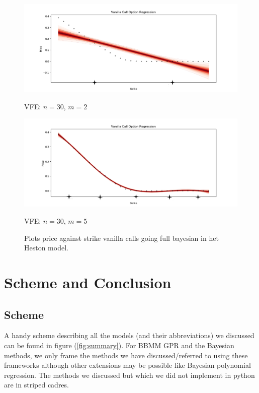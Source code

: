 \documentclass[12pt,a4paper,oneside]{book}
\begin{document}
\begin{figure}[!htb]
   \begin{minipage}{0.47\textwidth}
     \centering
     \includegraphics[width=1.1\linewidth]{full_bayesian_5}
     \caption*{VFE: $n=30$, $m=2$}\label{fig:bayesian_5}
   \end{minipage}\hfill
   \begin{minipage}{0.47\textwidth}
     \centering
     \includegraphics[width=1.1\linewidth]{full_bayesian_6}
     \caption*{VFE: $n=30$, $m=5$}\label{fig:bayesian_6}
   \end{minipage}\hfill
        \caption{Plots price against strike vanilla calls going full bayesian in het Heston model.}\label{fig:bayesian_7}
\end{figure}


\chapter{Scheme and Conclusion}\label{sum_conc}

\section{Scheme}\label{summary}

A handy scheme describing all the models (and their abbreviations) we discussed can be found in figure (\ref{fig:summary}). For BBMM GPR and the Bayesian methods, we only frame the methods we have discussed/referred to using these frameworks although other extensions may be possible like Bayesian polynomial regression. The methods we discussed but which we did not implement in python are in striped cadres.
\end{document}

